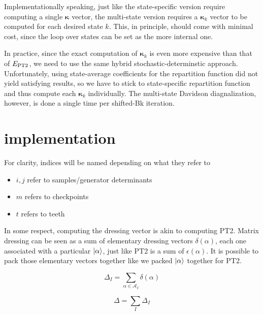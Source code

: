 \documentclass[./thesis.tex]{subfiles}
\begin{document}
Implementationally speaking, just like the state-specific version require computing a single ${\pmb \kappa}$ vector, the multi-state version requires a ${\pmb \kappa}_k$ vector to be computed for each desired state $k$. This, in principle, should come with minimal cost, since the loop over states can be set as the more internal one.

\begin{algorithm}[h!]
\end{algorithm}


In practice, since the exact computation of ${\pmb \kappa}_k$ is even more expensive than that of $E_\text{PT2}$, we need to use the same hybrid stochastic-determinstic approach. Unfortunately, using state-average coefficients for the repartition function did not yield satisfying results, so we have to stick to state-specific repartition function and thus compute each ${\pmb \kappa}_k$ individually. The multi-state Davidson diagnalization, however, is done a single time per shifted-Bk iteration.


\section{implementation}
For clarity, indices will be named depending on what they refer to
\begin{itemize}
\item
$i,j$ refer to samples/generator determinants
\item
$m$ refers to checkpoints
\item
$t$ refers to teeth
\end{itemize}

In some respect, computing the dressing vector is akin to computing PT2. Matrix dressing can be seen as a sum of elementary dressing vectors $\delta(\alpha)$, each one associated with a particular $\ket \alpha$, just like PT2 is a sum of $\epsilon(\alpha)$. It is possible to pack those elementary vectors together like we packed $\ket \alpha$ together for PT2.

\begin{equation}
\Delta_I = \sum_{\alpha \in \mathcal{A}_I} \delta(\alpha)
\end{equation}


\begin{equation}
\Delta = \sum_{I} \Delta_I
\end{equation}
\end{document}
